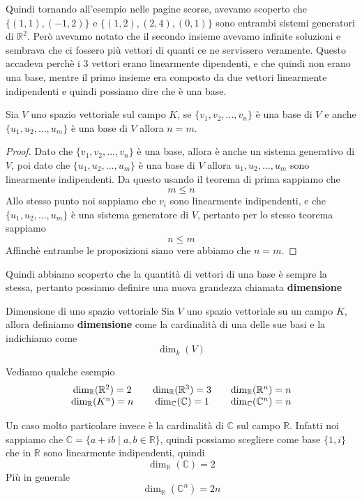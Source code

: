 \documentclass{rapport}
\begin{document}
  Quindi tornando all'esempio nelle pagine scorse, avevamo scoperto che $\{(1, 1), (-1, 2)\}$ e $\{(1,2),(2, 4), (0, 1)\}$ sono entrambi sistemi generatori di $\mathbb{R}^2$. Però avevamo notato che il secondo insieme avevamo infinite soluzioni e sembrava che ci fossero più vettori di quanti ce ne servissero veramente. Questo accadeva perchè i 3 vettori erano linearmente dipendenti, e che quindi non erano una base, mentre il primo insieme era composto da due vettori linearmente indipendenti e quindi possiamo dire che è una base.
  
  \begin{teorema}{}{}
    Sia $V$ uno spazio vettoriale sul campo $K$, se $\{v_1, v_2, ..., v_n\}$ è una base di $V$ e anche $\{u_1, u_2, ..., u_m\}$ è una base di $V$ allora $n = m$.
  \end{teorema}
  \begin{proof}
    Dato che $\{v_1, v_2, ..., v_n\}$ è una base, allora è anche un sistema generativo di $V$, poi dato che $\{u_1, u_2, ..., u_m\}$ è una base di $V$ allora $u_1, u_2, ..., u_m$ sono linearmente indipendenti. Da questo usando il teorema di prima sappiamo che 
    \[
    m \leq n
    \]
    Allo stesso punto noi sappiamo che  $v_i$ sono linearmente indipendenti, e che $\{u_1, u_2, ..., u_m\}$ è una sistema generatore di $V$, pertanto per lo stesso teorema sappiamo 
    \[
    n \leq m
    \]
    Affinchè entrambe le proposizioni siano vere abbiamo che $n=m$.
  \end{proof}

  Quindi abbiamo scoperto che la quantità di vettori di una base è sempre la stessa, pertanto possiamo definire una nuova grandezza chiamata \textbf{dimensione}
  \begin{definizione}{Dimensione di uno spazio vettoriale }{}
    Sia $V$ uno spazio vettoriale su un campo $K$, allora definiamo \textbf{dimensione} come la cardinalità di una delle sue basi e la indichiamo come 
    \[
    \dim_k(V)
    \]
    \end{definizione}
  
    Vediamo qualche esempio
    \[
    \begin{array}{c@{\qquad}c@{\qquad}c}
    \dim_\mathbb{R}(\mathbb{R}^2) =  2 & \dim_\mathbb{R}(\mathbb{R}^3) =  3 & \dim_\mathbb{R}(\mathbb{R}^n) =  n \\
    \dim_\mathbb{R}(K^n) =  n & \dim_\mathbb{C}(\mathbb{C}) = 1 & \dim_\mathbb{C}(\mathbb{C}^n) = n
    \end{array}
    \]

    Un caso molto particolare invece è la cardinalità di $\mathbb{C}$ sul campo $\mathbb{R}$. Infatti noi sappiamo che $\mathbb{C} = \{a +ib \;|\; a,b\in\mathbb{R}\}$, quindi possiamo scegliere come base $\{1, i\}$ che in $\mathbb{R} $ sono linearmente indipendenti, quindi 
    \[
    \dim_\mathbb{R}(\mathbb{C}) = 2
    \]
    Più in generale 
    \[
    \dim_\mathbb{R}(\mathbb{C}^n) = 2n
    \]
\end{document}
